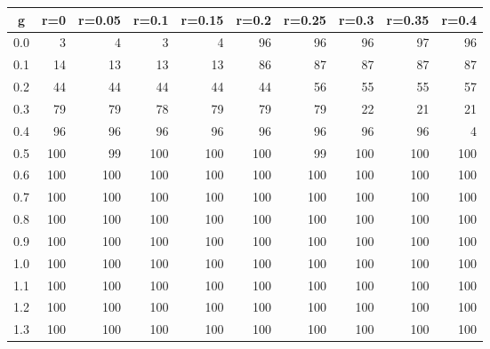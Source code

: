 %
\begin{table}[!tbp]
 \begin{center}
 \begin{tabular}{rrrrrrrrrr}\hline\hline
\multicolumn{1}{c}{g}&\multicolumn{1}{c}{r=0}&\multicolumn{1}{c}{r=0.05}&\multicolumn{1}{c}{r=0.1}&\multicolumn{1}{c}{r=0.15}&\multicolumn{1}{c}{r=0.2}&\multicolumn{1}{c}{r=0.25}&\multicolumn{1}{c}{r=0.3}&\multicolumn{1}{c}{r=0.35}&\multicolumn{1}{c}{r=0.4}\tabularnewline
\hline
0.0&  3&  4&  3&  4& 96& 96& 96& 97& 96\tabularnewline
0.1& 14& 13& 13& 13& 86& 87& 87& 87& 87\tabularnewline
0.2& 44& 44& 44& 44& 44& 56& 55& 55& 57\tabularnewline
0.3& 79& 79& 78& 79& 79& 79& 22& 21& 21\tabularnewline
0.4& 96& 96& 96& 96& 96& 96& 96& 96&  4\tabularnewline
0.5&100& 99&100&100&100& 99&100&100&100\tabularnewline
0.6&100&100&100&100&100&100&100&100&100\tabularnewline
0.7&100&100&100&100&100&100&100&100&100\tabularnewline
0.8&100&100&100&100&100&100&100&100&100\tabularnewline
0.9&100&100&100&100&100&100&100&100&100\tabularnewline
1.0&100&100&100&100&100&100&100&100&100\tabularnewline
1.1&100&100&100&100&100&100&100&100&100\tabularnewline
1.2&100&100&100&100&100&100&100&100&100\tabularnewline
1.3&100&100&100&100&100&100&100&100&100\tabularnewline
\hline
\end{tabular}

\end{center}

\end{table}

